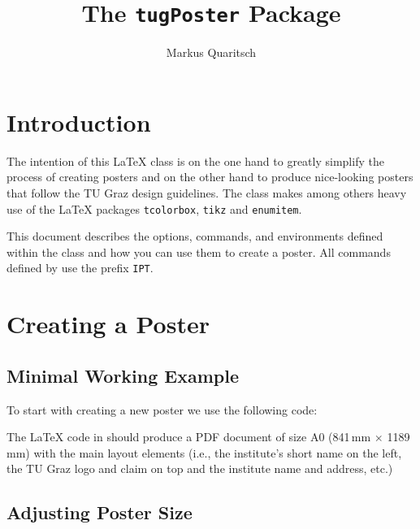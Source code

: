 
\title{The \texttt{tugPoster} Package}
\author{Markus Quaritsch}


	\maketitle

	\tableofcontents

\section{Introduction}

The intention of this \LaTeX{} class is on the one hand to greatly simplify the process of creating posters and on the other hand to produce nice-looking posters that follow the TU Graz design guidelines. The \tugPoster{} class makes among others heavy use of the  \LaTeX{} packages \texttt{tcolorbox}, \texttt{tikz} and \texttt{enumitem}. 

This document describes the options, commands, and environments defined within the \tugPoster{} class and how you can use them to create a poster. All commands defined by \tugPoster{} use the prefix \texttt{IPT}.


\section{Creating a Poster}

\subsection{Minimal Working Example}

To start with creating a new poster we use the following code:


The \LaTeX{} code in  should produce a PDF document of size A0 (841\,mm $\times$ 1189\,mm) with the main layout elements (i.e., the institute's short name on the left, the TU Graz logo and claim on top and the institute name and address, etc.)

\subsection{Adjusting Poster Size}

